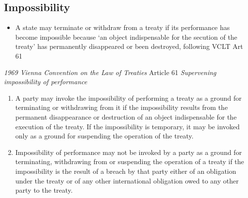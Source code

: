 \subsection{Impossibility}
\begin{itemize}
    \item A state may terminate or withdraw from a treaty if its performance has become impossible because `an object indispensable for the secution of the treaty' has permanently disappeared or been destroyed, following VCLT Art 61
\end{itemize}
\begin{conventiondetails}{\textit{1969 Vienna Convention on the Law of Treaties} Article 61}\label{VCLT Art 61}
    \flushleft
    \textit{Supervening impossibility of performance}

    \begin{enumerate}
        \item A party may invoke the impossibility of performing a treaty as a ground for terminating or withdrawing from it if the impossibility results from the permanent disappearance or destruction of an object indispensable for the execution of the treaty. If the impossibility is temporary, it may be invoked only as a ground for suspending the operation of the treaty. 
        \item Impossibility of performance may not be invoked by a party as a ground for terminating, withdrawing from or suspending the operation of a treaty if the impossibility is the result of a breach by that party either of an obligation under the treaty or of any other international obligation owed to any other party to the treaty. 
    \end{enumerate}
\end{conventiondetails}

